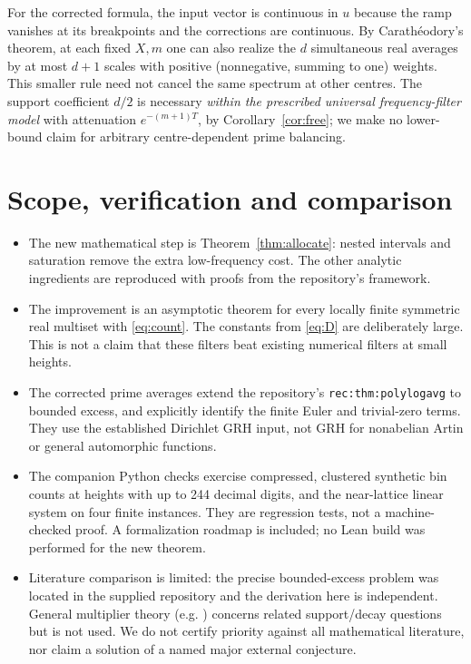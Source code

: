 \documentclass[11pt,letterpaper]{article}
\theoremstyle{remark}\newtheorem{remark}[theorem]{Remark}
\begin{document}
For the corrected formula, the input vector is continuous in $u$ because the ramp vanishes at its breakpoints and the corrections are continuous. By Carath\'eodory's theorem, at each fixed $X,m$ one can also realize the $d$ simultaneous real averages by at most $d+1$ scales with positive (nonnegative, summing to one) weights. This smaller rule need not cancel the same spectrum at other centres. The support coefficient $d/2$ is necessary \emph{within the prescribed universal frequency-filter model} with attenuation $e^{-(m+1)T}$, by Corollary~\ref{cor:free}; we make no lower-bound claim for arbitrary centre-dependent prime balancing.

\section{Scope, verification and comparison}
\begin{itemize}[leftmargin=1.4em,itemsep=2pt]
\item The new mathematical step is Theorem~\ref{thm:allocate}: nested intervals and saturation remove the extra low-frequency cost. The other analytic ingredients are reproduced with proofs from the repository's framework.
\item The improvement is an asymptotic theorem for every locally finite symmetric real multiset with \eqref{eq:count}. The constants from \eqref{eq:D} are deliberately large. This is not a claim that these filters beat existing numerical filters at small heights.
\item The corrected prime averages extend the repository's \texttt{rec:thm:polylogavg} to bounded excess, and explicitly identify the finite Euler and trivial-zero terms. They use the established Dirichlet GRH input, not GRH for nonabelian Artin or general automorphic functions.
\item The companion Python checks exercise compressed, clustered synthetic bin counts at heights with up to 244 decimal digits, and the near-lattice linear system on four finite instances. They are regression tests, not a machine-checked proof. A formalization roadmap is included; no Lean build was performed for the new theorem.
\item Literature comparison is limited: the precise bounded-excess problem was located in the supplied repository and the derivation here is independent. General multiplier theory (e.g. \cite{BM}) concerns related support/decay questions but is not used. We do not certify priority against all mathematical literature, nor claim a solution of a named major external conjecture.
\end{itemize}
\end{document}
